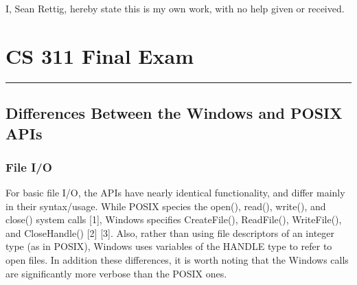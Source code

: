 \documentclass[letterpaper,10pt,fleqn]{article}
\def\name{Sean Rettig}
\numberwithin{equation}{section}
\begin{document}
I, \name, hereby state this is my own work, with no help given or received.


\section*{CS 311 Final Exam}
\hrule

\subsection*{Differences Between the Windows and POSIX APIs}

\subsubsection*{File I/O}

For basic file I/O, the APIs have nearly identical functionality, and differ mainly in their syntax/usage.  While POSIX species the open(), read(), write(), and close() system calls {[}1{]}, Windows specifies CreateFile(), ReadFile(), WriteFile(), and CloseHandle() {[}2{]} {[}3{]}.  Also, rather than using file descriptors of an integer type (as in POSIX), Windows uses variables of the HANDLE type to refer to open files.  In addition these differences, it is worth noting that the Windows calls are significantly more verbose than the POSIX ones.
\end{document}
